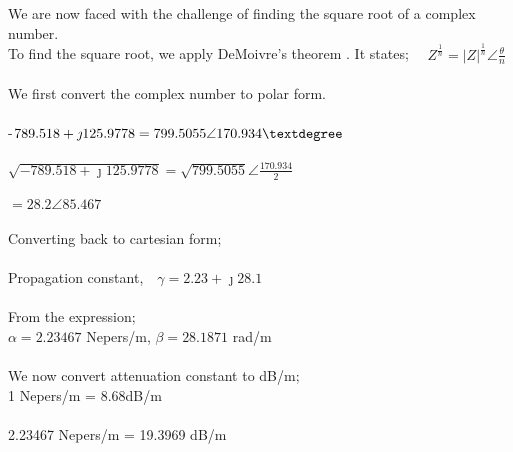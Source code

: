\begin{exmp}
	We are now faced with the challenge of finding the square root of a complex number.
	\\
		To find the square root, we apply DeMoivre's theorem \footnotemark[3]. It states; $ \quad Z^{\frac{1}{n}} = |Z|^{\frac{1}{n}}\angle\frac{\theta}{n} $\\\\
		We first convert the complex number to polar form.\\\\
		-$ 789.518 + \jmath 125.9778 = 799.5055\angle 170.934\textdegree $\\\\
		$ \sqrt{-789.518 + \jmath 125.9778} = \sqrt{799.5055}\angle \frac{170.934}{2} $\\\\
		$ =28.2\angle 85.467 $\\\\
		Converting back to cartesian form; \\\\
		Propagation constant,$\quad\gamma=2.23 +\jmath 28.1 $\\\\
		From the expression; \\
		$ \alpha = 2.23467 $ Nepers/m, $ \beta = 28.1871 $ rad/m\\\\
		We now convert attenuation constant to dB/m; \\
		1 Nepers/m = 8.68dB/m \\\\
		2.23467 Nepers/m = 19.3969 dB/m

\end{exmp} 

